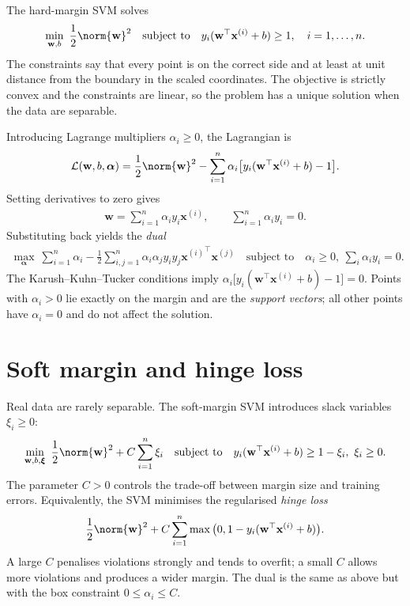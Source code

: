 \documentclass[a4paper, 12pt]{book}
\begin{document}
The hard-margin SVM solves
\begin{align}
    \min_{\mathbf{w},b}\ \frac{1}{2}\norm{\mathbf{w}}^2
    \quad \text{subject to} \quad
    y_i(\mathbf{w}^\top\mathbf{x}^{(i)}+b) \geq 1, \quad i=1,\ldots,n.
\end{align}
The constraints say that every point is on the correct side and at least at unit
distance from the boundary in the scaled coordinates. The objective is strictly convex
and the constraints are linear, so the problem has a unique solution when the data are
separable.

Introducing Lagrange multipliers $\alpha_i \geq 0$, the Lagrangian is
\begin{align}
    \mathcal{L}(\mathbf{w},b,\boldsymbol{\alpha})
    = \frac{1}{2}\norm{\mathbf{w}}^2
    - \sum_{i=1}^n \alpha_i\big[y_i(\mathbf{w}^\top\mathbf{x}^{(i)}+b)-1\big].
\end{align}
Setting derivatives to zero gives
\begin{align}
    \mathbf{w} = \sum_{i=1}^n \alpha_i y_i \mathbf{x}^{(i)},
    \qquad
    \sum_{i=1}^n \alpha_i y_i = 0.
\end{align}
Substituting back yields the \emph{dual}
\begin{align}
    \max_{\boldsymbol{\alpha}}\
    \sum_{i=1}^n \alpha_i
    - \frac{1}{2}\sum_{i,j=1}^n \alpha_i\alpha_j y_i y_j
      {\mathbf{x}^{(i)}}^\top\mathbf{x}^{(j)}
    \quad \text{subject to} \quad
    \alpha_i \geq 0,\ \sum_i \alpha_i y_i = 0.
\end{align}
The Karush--Kuhn--Tucker conditions imply
$\alpha_i\big[y_i(\mathbf{w}^\top\mathbf{x}^{(i)}+b)-1\big]=0$. Points with
$\alpha_i>0$ lie exactly on the margin and are the \emph{support vectors}; all other
points have $\alpha_i=0$ and do not affect the solution.

\section{Soft margin and hinge loss}

Real data are rarely separable. The soft-margin SVM introduces slack variables
$\xi_i \geq 0$:
\begin{align}
    \min_{\mathbf{w},b,\boldsymbol{\xi}}\
    \frac{1}{2}\norm{\mathbf{w}}^2 + C\sum_{i=1}^n \xi_i
    \quad \text{subject to} \quad
    y_i(\mathbf{w}^\top\mathbf{x}^{(i)}+b) \geq 1-\xi_i,\ \xi_i \geq 0.
\end{align}
The parameter $C>0$ controls the trade-off between margin size and training errors.
Equivalently, the SVM minimises the regularised \emph{hinge loss}
\begin{align}
    \frac{1}{2}\norm{\mathbf{w}}^2
    + C\sum_{i=1}^n \max\big(0, 1-y_i(\mathbf{w}^\top\mathbf{x}^{(i)}+b)\big).
\end{align}
A large $C$ penalises violations strongly and tends to overfit; a small $C$ allows
more violations and produces a wider margin. The dual is the same as above but with
the box constraint $0 \leq \alpha_i \leq C$.
\end{document}
